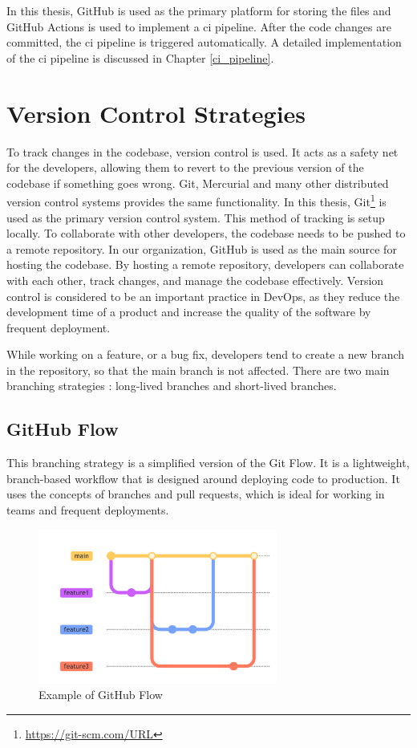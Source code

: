     In this thesis, GitHub is used as the primary platform for storing the files and GitHub Actions is used to implement a \acrshort{ci} pipeline. After the code 
    changes are committed, the \acrshort{ci} pipeline is triggered automatically. A detailed implementation of the \acrshort{ci} pipeline is discussed in 
    Chapter \ref{ci_pipeline}. 

\section{Version Control Strategies} \label{version_control}
To track changes in the codebase, version control is used. It acts as a safety net for the developers, allowing them to revert to the previous version of the 
codebase if something goes wrong. Git, Mercurial and many other distributed version control systems provides the same functionality. In this thesis, 
Git\footnote{\url{https://git-scm.com/URL}} is used as the primary version control system. This method of tracking is setup locally. To collaborate with other 
developers, the codebase needs to be pushed  to a remote repository. In our organization, GitHub is used as the main source for hosting the codebase. By hosting a remote
repository, developers can collaborate with each other, track changes, and manage the codebase effectively. Version control is considered to be an important
practice in DevOps, as they reduce the development time of a product and increase the quality of the software by frequent deployment.

While working on a feature, or a bug fix, developers tend to create a new branch in the repository, so that the main branch is not affected. There are two main 
branching strategies : long-lived branches and short-lived branches. 
\subsection{GitHub Flow}
This branching strategy is a simplified version of the Git Flow. It is a lightweight, branch-based workflow that is designed around deploying code to production. 
It uses the concepts of branches and pull requests, which is ideal for working in teams and frequent deployments.
\begin{figure}[!ht]
    \centering
    \includegraphics[width=0.7\textwidth]{Images/github_flow.pdf}
    \caption{Example of GitHub Flow}
    \label{github_flow}
\end{figure} 

